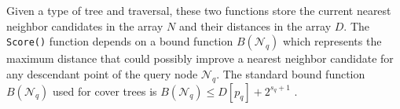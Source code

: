 Given a type of tree and traversal, these two functions store the current
nearest neighbor candidates in the array $N$ and their distances in the array
$D$. \citep[see][for a more complete
discussion of how this algorithm works and a proof of
correctness.]{curtin2013tree}  The
\texttt{Score()} function depends on a bound function $B(\mathscr{N}_q)$ which
represents the maximum distance that could possibly improve a nearest neighbor
candidate for any descendant point of the query node $\mathscr{N}_q$.  The
standard bound function $B(\mathscr{N}_q)$ used for cover trees is
$B(\mathscr{N}_q) \le D[p_q] + 2^{s_q + 1}$ \citep[this is adapted from][]{langford2006}.





